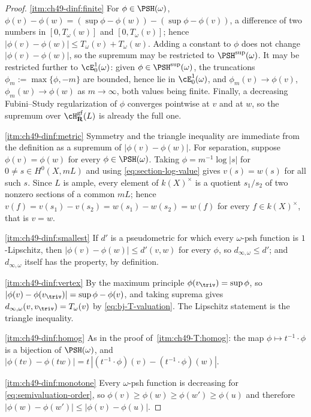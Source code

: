 \begin{proof}
\cref{itm:ch49-dinf:finite}  For $\phi\in\PSH(\omega)$,
$\phi(v)-\phi(w)=(\sup\phi-\phi(w))-(\sup\phi-\phi(v))$, a difference of
two numbers in $[0,T_\omega(w)]$ and $[0,T_\omega(v)]$; hence
$|\phi(v)-\phi(w)|\le T_\omega(v)+T_\omega(w)$.  Adding a constant to
$\phi$ does not change $|\phi(v)-\phi(w)|$, so the supremum may be
restricted to $\PSH^{\sup}(\omega)$.  It may be restricted further to
$\cE^1_0(\omega)$: given $\phi\in\PSH^{\sup}(\omega)$, the truncations
$\phi_m:=\max\{\phi,-m\}$ are bounded, hence lie in
$\cE^1_0(\omega)$, and $\phi_m(v)\to\phi(v)$,
$\phi_m(w)\to\phi(w)$ as $m\to\infty$, both values being finite.
Finally, a decreasing Fubini--Study regularization
 of $\phi$ converges pointwise at
$v$ and at $w$, so the supremum over
$\cH^{\mathrm{gf}}_{\mathbf R}(L)$ is already the full one.

\cref{itm:ch49-dinf:metric}  Symmetry and the triangle inequality are
immediate from the definition as a supremum of $|\phi(v)-\phi(w)|$.  For
separation, suppose $\phi(v)=\phi(w)$ for every $\phi\in\PSH(\omega)$.
Taking $\phi=m^{-1}\log|s|$ for $0\ne s\in H^0(X,mL)$ and using
\eqref{eq:section-log-value} gives $v(s)=w(s)$ for all such $s$.  Since
$L$ is ample, every element of $k(X)^\times$ is a quotient
$s_1/s_2$ of two nonzero sections of a common $mL$; hence
$v(f)=v(s_1)-v(s_2)=w(s_1)-w(s_2)=w(f)$ for every $f\in k(X)^\times$,
that is $v=w$.

\cref{itm:ch49-dinf:smallest}  If $d'$ is a pseudometric for which every
$\omega$-psh function is $1$-Lipschitz, then
$|\phi(v)-\phi(w)|\le d'(v,w)$ for every $\phi$, so
$d_{\infty,\omega}\le d'$; and $d_{\infty,\omega}$ itself has the
property, by definition.

\cref{itm:ch49-dinf:vertex}  By the maximum principle
$\phi(v_{\triv})=\sup\phi$, so
$|\phi(v)-\phi(v_{\triv})|=\sup\phi-\phi(v)$, and taking suprema gives
$d_{\infty,\omega}(v,v_{\triv})=T_\omega(v)$ by
\eqref{eq:bj-T-valuation}.  The Lipschitz statement is the triangle
inequality.

\cref{itm:ch49-dinf:homog}  As in the proof of
\,\cref{itm:ch49-T:homog}: the map
$\phi\mapsto t^{-1}\cdot\phi$ is a bijection of $\PSH(\omega)$, and
$|\phi(tv)-\phi(tw)|
=t\,|(t^{-1}\cdot\phi)(v)-(t^{-1}\cdot\phi)(w)|$.

\cref{itm:ch49-dinf:monotone}  Every $\omega$-psh function is decreasing
for \eqref{eq:semivaluation-order}, so
$\phi(v)\ge\phi(w)\ge\phi(w')\ge\phi(u)$ and therefore
$|\phi(w)-\phi(w')|\le|\phi(v)-\phi(u)|$.


\end{proof}
